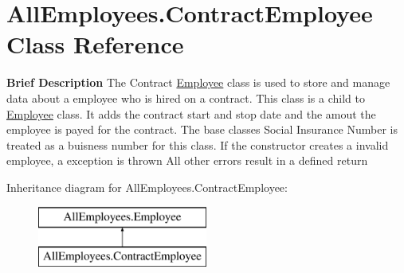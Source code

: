 \hypertarget{class_all_employees_1_1_contract_employee}{}\section{All\+Employees.\+Contract\+Employee Class Reference}
\label{class_all_employees_1_1_contract_employee}


{\bfseries Brief Description} The Contract \hyperlink{class_all_employees_1_1_employee}{Employee} class is used to store and manage data about a employee who is hired on a contract. This class is a child to \hyperlink{class_all_employees_1_1_employee}{Employee} class. It adds the contract start and stop date and the amout the employee is payed for the contract. The base classes Social Insurance Number is treated as a buisness number for this class. If the constructor creates a invalid employee, a exception is thrown All other errors result in a defined return  


Inheritance diagram for All\+Employees.\+Contract\+Employee\+:\begin{figure}[H]
\begin{center}
\leavevmode
\includegraphics[height=2.000000cm]{class_all_employees_1_1_contract_employee}
\end{center}
\end{figure}
